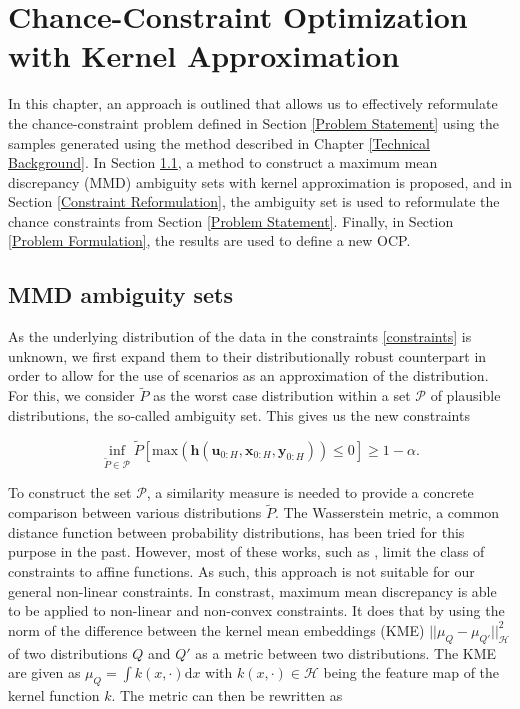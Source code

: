 \chapter{Chance-Constraint Optimization with Kernel Approximation} \label{Technical Approach}

In this chapter, an approach is outlined that allows us to effectively reformulate the chance-constraint problem defined in Section \ref{Problem Statement} using the samples generated using the method described in Chapter \ref{Technical Background}. In Section \ref{SubSec:MMD}, a method to construct a maximum mean discrepancy (MMD) ambiguity sets with kernel approximation is proposed, and in Section \ref{Constraint Reformulation}, the ambiguity set is used to reformulate the chance constraints from Section \ref{Problem Statement}. Finally, in Section \ref{Problem Formulation}, the results are used to define a new OCP.

\section{MMD ambiguity sets} \label{SubSec:MMD}

As the underlying distribution of the data in the constraints \eqref{constraints} is unknown, we first expand them to their distributionally robust counterpart in order to allow for the use of scenarios as an approximation of the distribution. For this, we consider $\tilde{P}$ as the worst case distribution within a set $\mathcal{P}$ of plausible distributions, the so-called ambiguity set. This gives us the new constraints

\begin{equation} \label{wc constraints}
\inf\limits_{\tilde{P} \in \mathcal{P}}\tilde{P} \left[ \text{max}(\boldsymbol{h}(\boldsymbol{u}_{0:H},  \boldsymbol{x}_{0:H},  \boldsymbol{y}_{0:H})) \leq 0 \right] \geq 1 - \alpha.
\end{equation}

To construct the set $\mathcal{P}$, a similarity measure is needed to provide a concrete comparison between various distributions $\tilde{P}$. The Wasserstein metric, a common distance function between probability distributions, has been tried for this purpose in the past. However, most of these works, such as \cite{Hota_19}, limit the class of constraints to affine functions. As such, this approach is not suitable for our general non-linear constraints. In constrast, maximum mean discrepancy \cite{Arthur_12} is able to be applied to non-linear and non-convex constraints. It does that by using the norm of the difference between the kernel mean embeddings (KME) $|| \mu_Q - \mu_{Q'} ||^2_{\mathcal{H}}$ of two distributions $Q$ and $Q'$ as a metric between two distributions. The KME are given as $\mu_Q = \int k(x, \cdot) \text{d}x$ with $k(x, \cdot) \in \mathcal{H}$ being the feature map of the kernel function $k$. The metric can then be rewritten as 


